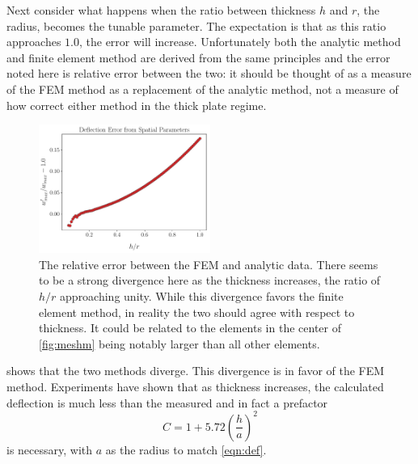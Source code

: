 \documentclass[12pt,times,twocolumn,3p]{elsarticle}
\begin{document}
Next consider what happens when the ratio between thickness $h$ and $r$, the
radius, becomes the tunable parameter. The expectation is that as this ratio
approaches $1.0$, the error will increase. Unfortunately both the analytic
method and finite element method are derived from the same principles and the
error noted here is relative error between the two: it should be thought of as
a measure of the FEM method as a replacement of the analytic method, not a
measure of how correct either method in the thick plate regime.
\begin{figure}[h]
    \centering
    \includegraphics[width=0.5\textwidth]{./tr_scaling_err.pdf}
    \caption{The relative error between the FEM and analytic data. There seems
    to be a strong divergence here as the thickness increases, the ratio of
    $h/r$ approaching unity. While this divergence favors the finite element
    method, in reality the two should agree with respect to thickness. It could
    be related to the elements in the center of \cref{fig:meshm} being notably
    larger than all other elements.}
    \label{fig:tre}
\end{figure}
shows that the two methods diverge. This divergence is in favor of the FEM method.
Experiments have shown that as thickness increases, the calculated deflection is
much less than the measured and in fact a prefactor
\begin{equation} \label{eqn:pre}
    C = 1 + 5.72\left(\frac{h}{a}\right)^2
\end{equation}
is necessary, with $a$ as the radius to match \cref{eqn:def}. 
\end{document}
